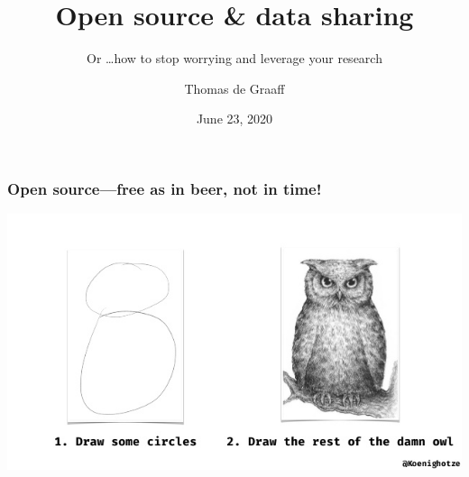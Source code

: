 \documentclass[ignorenonframetext]{beamer}
\title{Open source \& data sharing}
\subtitle{Or \ldots how to stop worrying and leverage your research}
\author{Thomas de Graaff}
\institute{Department of Spatial Economics}
\date{June 23, 2020}
\begin{document}
\frame{\titlepage}

\begin{frame}
  \frametitle{Open source---free as in beer, not in time!}
    \centering
    \includegraphics[width = 1\textwidth]{owl.jpg}
  \end{frame}
\end{document}
